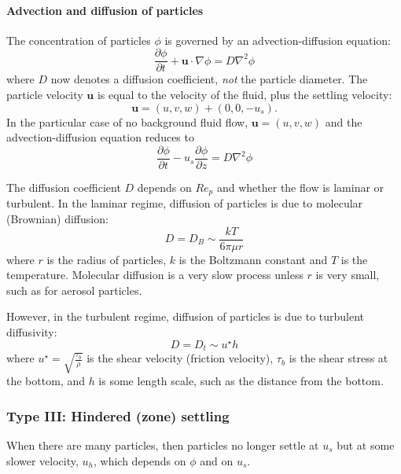 \paragraph{Advection and diffusion of particles} The concentration of particles
$\phi$ is governed by an advection-diffusion equation:
\begin{equation}
    \frac{\partial\phi}{\partial t} + \mathbf{u}\cdot\nabla\phi = D\nabla^2\phi
\end{equation}
where $D$ now denotes a diffusion coefficient, \textit{not} the particle
diameter. The particle velocity $\mathbf{u}$ is equal to the velocity of the
fluid, plus the settling velocity:
\begin{equation}
    \mathbf{u} = (u, v, w) + (0, 0, -u_s).
\end{equation}
In the particular case of no background fluid flow, $\mathbf{u} = (u,v,w)$ and
the advection-diffusion equation reduces to
\begin{equation}
    \frac{\partial\phi}{\partial t} - u_s\frac{\partial\phi}{\partial z} = D\nabla^2\phi
\end{equation}

The diffusion coefficient $D$ depends on $Re_p$ and whether the flow is laminar
or turbulent. In the laminar regime, diffusion of particles is due to molecular
(Brownian) diffusion: 
\begin{equation}
    D = D_B \sim \frac{kT}{6\pi\mu r}
\end{equation}
where $r$ is the radius of particles, $k$ is the Boltzmann constant and $T$ is
the temperature. Molecular diffusion is a very slow process unless $r$ is very
small, such as for aerosol particles.

However, in the turbulent regime, diffusion of particles is due to turbulent
diffusivity:
\begin{equation}
    D = D_t \sim u^\star h
\end{equation}
where $u^\star = \sqrt{\frac{\tau_b}{\rho}}$ is the shear velocity (friction
velocity), $\tau_b$ is the shear stress at the bottom, and $h$ is some length
scale, such as the distance from the bottom.

\subsubsection{Type III: Hindered (zone) settling}

When there are many particles, then particles no longer settle at $u_s$ but at
some slower velocity, $u_h$, which depends on $\phi$ and on $u_s$. 


